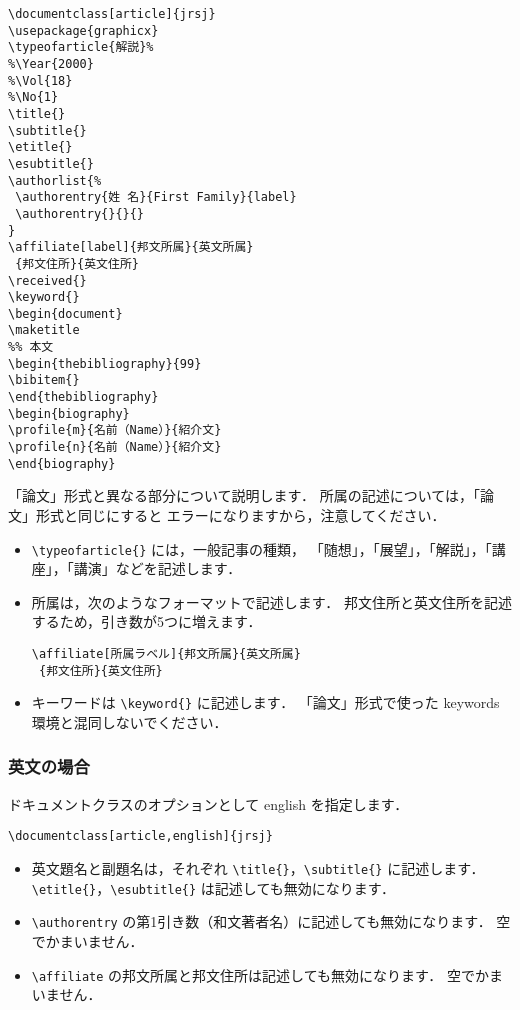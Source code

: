 \documentclass[paper]{jrsj}    %
\begin{document}
\begin{verbatim}
\documentclass[article]{jrsj}
\usepackage{graphicx}
\typeofarticle{解説}% 
%\Year{2000}
%\Vol{18}
%\No{1}
\title{}
\subtitle{}
\etitle{}
\esubtitle{}
\authorlist{%
 \authorentry{姓 名}{First Family}{label}
 \authorentry{}{}{}
}
\affiliate[label]{邦文所属}{英文所属}
 {邦文住所}{英文住所}
\received{}
\keyword{}
\begin{document}
\maketitle
%% 本文
\begin{thebibliography}{99}
\bibitem{}
\end{thebibliography}
\begin{biography}
\profile{m}{名前（Name）}{紹介文}
\profile{n}{名前（Name）}{紹介文}
\end{biography}
\end{verbatim}

「論文」形式と異なる部分について説明します．
所属の記述については，「論文」形式と同じにすると
エラーになりますから，注意してください．
\begin{itemize}
\item
\verb/\typeofarticle{}/ には，一般記事の種類，
「随想」，「展望」，「解説」，「講座」，「講演」などを記述します．
\item
所属は，次のようなフォーマットで記述します．
邦文住所と英文住所を記述するため，引き数が5つに増えます．
\begin{verbatim}
\affiliate[所属ラベル]{邦文所属}{英文所属}
 {邦文住所}{英文住所}
\end{verbatim}
\item
キーワードは \verb/\keyword{}/ に記述します．
「論文」形式で使った keywords 環境と混同しないでください．
\end{itemize}

\subsubsection{英文の場合}\label{sec:english}

ドキュメントクラスのオプションとして {\ttfamily english} を指定します．
\begin{verbatim}
\documentclass[article,english]{jrsj}
\end{verbatim}

\begin{itemize}
\item
英文題名と副題名は，それぞれ
\verb/\title{}/，\verb/\subtitle{}/ に記述します．
\verb/\etitle{}/，\verb/\esubtitle{}/ は記述しても無効になります．

\item
\verb/\authorentry/ の第1引き数（和文著者名）に記述しても無効になります．
空でかまいません．

\item
\verb/\affiliate/ の邦文所属と邦文住所は記述しても無効になります．
空でかまいません．
\end{itemize}
\end{document}
